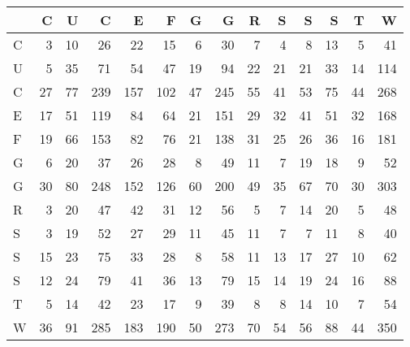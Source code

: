 \begin{tabular}{lrrrrrrrrrrrrr}
\toprule
{} &   C &   U &    C &    E &    F &   G &    G &   R &   S &   S &   S &   T &    W \\
\midrule
C &   3 &  10 &   26 &   22 &   15 &   6 &   30 &   7 &   4 &   8 &  13 &   5 &   41 \\
U &   5 &  35 &   71 &   54 &   47 &  19 &   94 &  22 &  21 &  21 &  33 &  14 &  114 \\
C &  27 &  77 &  239 &  157 &  102 &  47 &  245 &  55 &  41 &  53 &  75 &  44 &  268 \\
E &  17 &  51 &  119 &   84 &   64 &  21 &  151 &  29 &  32 &  41 &  51 &  32 &  168 \\
F &  19 &  66 &  153 &   82 &   76 &  21 &  138 &  31 &  25 &  26 &  36 &  16 &  181 \\
G &   6 &  20 &   37 &   26 &   28 &   8 &   49 &  11 &   7 &  19 &  18 &   9 &   52 \\
G &  30 &  80 &  248 &  152 &  126 &  60 &  200 &  49 &  35 &  67 &  70 &  30 &  303 \\
R &   3 &  20 &   47 &   42 &   31 &  12 &   56 &   5 &   7 &  14 &  20 &   5 &   48 \\
S &   3 &  19 &   52 &   27 &   29 &  11 &   45 &  11 &   7 &   7 &  11 &   8 &   40 \\
S &  15 &  23 &   75 &   33 &   28 &   8 &   58 &  11 &  13 &  17 &  27 &  10 &   62 \\
S &  12 &  24 &   79 &   41 &   36 &  13 &   79 &  15 &  14 &  19 &  24 &  16 &   88 \\
T &   5 &  14 &   42 &   23 &   17 &   9 &   39 &   8 &   8 &  14 &  10 &   7 &   54 \\
W &  36 &  91 &  285 &  183 &  190 &  50 &  273 &  70 &  54 &  56 &  88 &  44 &  350 \\
\bottomrule
\end{tabular}
